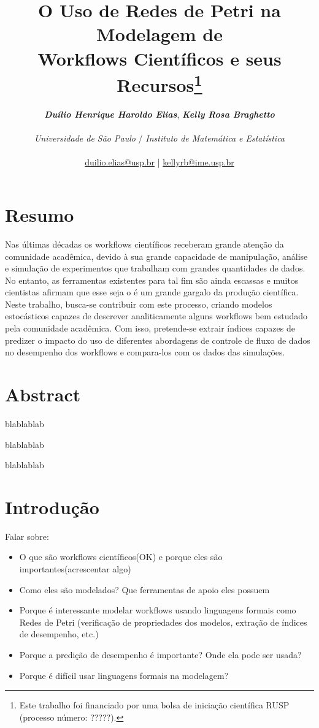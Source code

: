 \documentclass[a4paper,10pt]{article}
\date{}
\title{
    O Uso de Redes de Petri na Modelagem de \\Workflows Científicos e seus Recursos\footnote{Este trabalho foi financiado por uma bolsa de iniciação científica RUSP (processo número: ?????).}
}
\author{
\textbf{\textit{Duílio Henrique Haroldo Elias}},\textbf{ \textit{Kelly Rosa Braghetto}}\\
\\
\textit{Universidade de São Paulo} / \textit{Instituto de Matemática e Estatística}\\
\\
\href{mailto:duilio.elias@usp.br}{duilio.elias@usp.br} | \href{mailto:kellyrb@ime.usp.br}{kellyrb@ime.usp.br}
}
\begin{document}
\maketitle
    
\section*{Resumo}
	Nas últimas décadas os workflows científicos receberam grande atenção da comunidade acadêmica, devido à sua grande
capacidade de manipulação, análise e simulação de experimentos que trabalham com grandes quantidades de dados. No entanto,
as ferramentas existentes para tal fim são ainda escassas e muitos cientistas afirmam que esse seja o é um grande gargalo da produção científica. Neste trabalho, busca-se contribuir com este processo, criando modelos estocásticos capazes de descrever analiticamente alguns workflows bem estudado pela comunidade acadêmica. Com isso, pretende-se extrair índices capazes de predizer o impacto do uso de diferentes abordagens de controle de fluxo de dados no desempenho dos workflows e compara-los com os dados das simulações.

 
\section*{Abstract}

blablablab

blablablab

blablablab

\thispagestyle{fancy}

\newpage

\section*{Introdução}

Falar sobre:
\begin{itemize}
	\item O que são workflows científicos(OK) e porque eles são importantes(acrescentar algo)
	\item Como eles são modelados? Que ferramentas de apoio eles possuem
	\item Porque é interessante modelar workflows usando linguagens formais como Redes de Petri (verificação de propriedades dos modelos, extração de índices de desempenho, etc.)
	\item Porque a predição de desempenho é importante? Onde ela pode ser usada?
	\item Porque é difícil usar linguagens formais na modelagem? 
\end{itemize}
	
\end{document}
